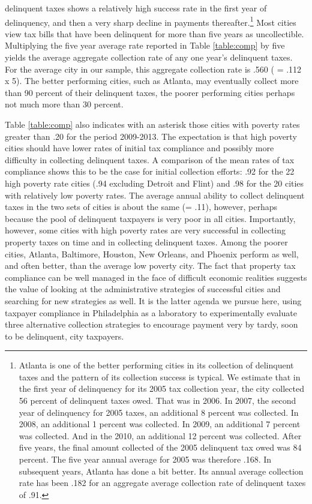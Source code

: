 \documentclass[12pt,titlepage]{article}
\begin{document}
delinquent taxes shows a relatively high success rate in the first
year of delinquency, and then a very sharp decline in payments
thereafter.\footnote{Atlanta is one of the better performing cities in
  its collection of delinquent taxes and the pattern of its collection
  success is typical.  We estimate that in the first year of
  delinquency for its 2005 tax collection year, the city collected 56
  percent of delinquent taxes owed. That was in 2006.  In 2007, the
  second year of delinquency for 2005 taxes, an additional 8 percent
  was collected.  In 2008, an additional 1 percent was collected.  In
  2009, an additional 7 percent was collected.  And in the 2010, an
  additional 12 percent was collected.  After five years, the final
  amount collected of the 2005 delinquent tax owed was 84 percent.
  The five year annual average for 2005 was therefore .168.  In
  subsequent years, Atlanta has done a bit better.  Its annual average
  collection rate has been .182 for an aggregate average collection
  rate of delinquent taxes of .91.} Most cities view tax bills that
have been delinquent for more than five years as uncollectible.
Multiplying the five year average rate reported in Table \ref{table:comp} by five
yields the average aggregate collection rate of any one year's
delinquent taxes.  For the average city in our sample, this aggregate
collection rate is .560 ( = .112 x 5).  The better performing cities,
such as Atlanta, may eventually collect more than 90 percent of their
delinquent taxes, the poorer performing cities perhaps not much more
than 30 percent.

Table \ref{table:comp} also indicates with an asterisk those cities with poverty rates greater than
.20 for the period 2009-2013.  The expectation is that high poverty
cities should have lower rates of initial tax compliance and possibly
more difficulty in collecting delinquent taxes.  A comparison of the
mean rates of tax compliance shows this to be the case for initial
collection efforts: .92 for the 22 high poverty rate cities (.94
excluding Detroit and Flint) and .98 for the 20 cities with relatively
low poverty rates.  The average annual ability to collect delinquent
taxes in the two sets of cities is about the same (= .11), however,
perhaps because the pool of delinquent taxpayers is very poor in all
cities.  Importantly, however, some cities with high poverty rates are
very successful in collecting property taxes on time and in collecting
delinquent taxes.  Among the poorer cities, Atlanta, Baltimore,
Houston, New Orleans, and Phoenix perform as well, and often better,
than the average low poverty city.  The fact that property tax
compliance can be well managed in the face of difficult economic
realities suggests the value of looking at the administrative
strategies of successful cities and searching for new strategies as
well.  It is the latter agenda we pursue here, using taxpayer
compliance in Philadelphia as a laboratory to experimentally evaluate
three alternative collection strategies to encourage payment very by tardy,
soon to be delinquent, city taxpayers.
\end{document}
